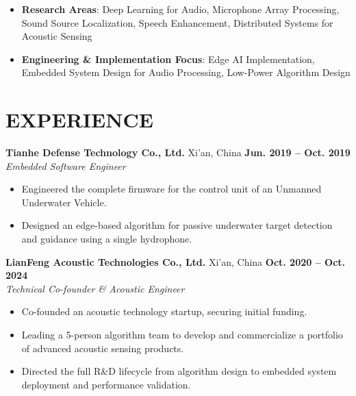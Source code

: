 \documentclass[a4paper,8pt]{article}
\begin{document}
\begin{minipage}[t]{\linewidth}
    \begin{itemize}[nosep,after=\strut, leftmargin=1em, itemsep=2pt]
        \item \textbf{Research Areas}: Deep Learning for Audio, Microphone Array Processing, Sound Source Localization, Speech Enhancement, Distributed Systems for Acoustic Sensing 
        \item \textbf{Engineering \& Implementation Focus}: Edge AI Implementation, Embedded System Design for Audio Processing, Low-Power Algorithm Design \\
    \end{itemize}
\end{minipage}

\section{\textbf{EXPERIENCE}}

\textbf{Tianhe Defense Technology Co., Ltd.} Xi'an, China \hfill \textbf{Jun. 2019 -- Oct. 2019}\\[4pt]
\textit{Embedded Software Engineer}
    \begin{itemize}[nosep,after=\strut, leftmargin=1em, itemsep=2pt]
        \item Engineered the complete firmware for the control unit of an Unmanned Underwater Vehicle.
        \item Designed an edge-based algorithm for passive underwater target detection and guidance using a single hydrophone.
    \end{itemize}
    
\textbf{LianFeng Acoustic Technologies Co., Ltd.} Xi'an, China  \hfill  \textbf{Oct. 2020 -- Oct. 2024} \\[4pt]
\textit{Technical Co-founder \& Acoustic Engineer} 

    \begin{itemize}[nosep,after=\strut, leftmargin=1em, itemsep=2pt]
        \item Co-founded an acoustic technology startup, securing initial funding. 
        \item Leading a 5-person algorithm team to develop and commercialize a portfolio of advanced acoustic sensing products.
        \item Directed the full R\&D lifecycle from algorithm design to embedded system deployment and performance validation. \\
    \end{itemize}
\end{document}
